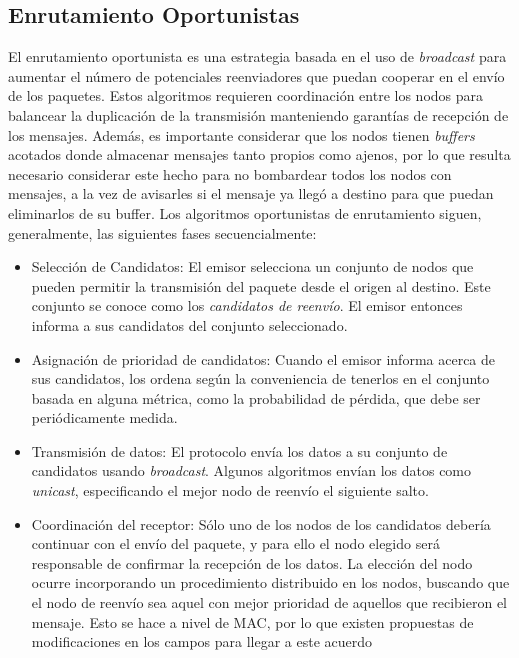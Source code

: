\documentclass[10pt,preprint,onecolumn]{article}
\begin{document}
\subsection{Enrutamiento Oportunistas}
\label{sec:op}
El enrutamiento oportunista es una estrategia basada en el uso de \emph{broadcast} para aumentar el número de potenciales reenviadores que puedan cooperar en el envío de los paquetes. Estos algoritmos requieren coordinación entre los nodos para balancear la duplicación de la transmisión manteniendo garantías de recepción de los mensajes. Además, es importante considerar que los nodos tienen \emph{buffers} acotados donde almacenar mensajes tanto propios como ajenos, por lo que resulta necesario considerar este hecho para no bombardear todos los nodos con mensajes, a la vez de avisarles si el mensaje ya llegó a destino para que puedan eliminarlos de su buffer.
Los algoritmos oportunistas de enrutamiento siguen, generalmente, las siguientes fases secuencialmente:
\begin{itemize}
\item Selección de Candidatos: El emisor selecciona un conjunto de nodos que pueden permitir la transmisión del paquete desde el origen al destino. Este conjunto se conoce como los \emph{candidatos de reenvío}. El emisor entonces informa a sus candidatos del conjunto seleccionado.

\item Asignación de prioridad de candidatos: Cuando el emisor informa acerca de sus candidatos, los ordena según la conveniencia de tenerlos en el conjunto basada en alguna métrica, como la probabilidad de pérdida, que debe ser periódicamente medida. 

\item Transmisión de datos: El protocolo envía los datos a su conjunto de candidatos usando \emph{broadcast}. Algunos algoritmos envían los datos como \emph{unicast}, especificando el mejor nodo de reenvío el siguiente salto. 

\item Coordinación del receptor: Sólo uno de los nodos de los candidatos debería continuar con el envío del paquete, y para ello el nodo elegido será responsable de confirmar la recepción de los datos. La elección del nodo ocurre incorporando un procedimiento distribuido en los nodos, buscando que el nodo de reenvío sea aquel con mejor prioridad de aquellos que recibieron el mensaje. Esto se hace a nivel de MAC, por lo que existen propuestas de modificaciones en los campos para llegar a este acuerdo \cite{mac}
\end{itemize}
\end{document}
